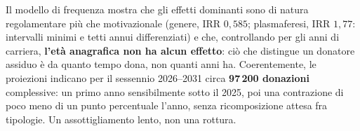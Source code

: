 Il modello di frequenza mostra che gli effetti dominanti sono di natura
regolamentare più che motivazionale (genere, IRR $0{,}585$; plasmaferesi, IRR
$1{,}77$: intervalli minimi e tetti annui differenziati) e che, controllando
per gli anni di carriera, \textbf{l'età anagrafica non ha alcun effetto}: ciò
che distingue un donatore assiduo è da quanto tempo dona, non quanti anni ha.
Coerentemente, le proiezioni indicano per il sessennio 2026--2031 circa
\textbf{97\,200 donazioni} complessive: un primo anno sensibilmente sotto il
2025, poi una contrazione di poco meno di un punto percentuale l'anno, senza
ricomposizione attesa fra tipologie. Un assottigliamento lento, non una
rottura.

